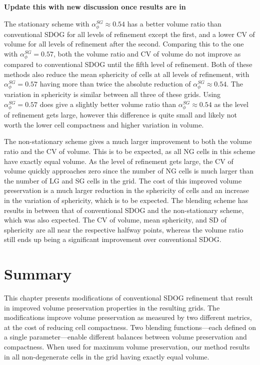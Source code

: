 \textbf{Update this with new discussion once results are in}

The stationary scheme with $\alpha_{\phi}^{SG} \approx 0.54$ has a better volume ratio than conventional SDOG for all levels of refinement except the first, and a lower CV of volume for all levels of refinement after the second.
Comparing this to the one with $\alpha_{\phi}^{SG} = 0.57$, both the volume ratio and CV of volume do not improve as compared to conventional SDOG until the fifth level of refinement.
Both of these methods also reduce the mean sphericity of cells at all levels of refinement, with $\alpha_{\phi}^{SG} = 0.57$ having more than twice the absolute reduction of $\alpha_{\phi}^{SG} \approx 0.54$.
The variation in sphericity is similar between all three of these grids.
Using $\alpha_{\phi}^{SG} = 0.57$ does give a slightly better volume ratio than $\alpha_{\phi}^{SG} \approx 0.54$ as the level of refinement gets large, however this difference is quite small and likely not worth the lower cell compactness and higher variation in volume.


The non-stationary scheme gives a much larger improvement to both the volume ratio and the CV of volume.
This is to be expected, as all NG cells in this scheme have exactly equal volume.
As the level of refinement gets large, the CV of volume quickly approaches zero since the number of NG cells is much larger than the number of LG and SG cells in the grid.
The cost of this improved volume preservation is a much larger reduction in the sphericity of cells and an increase in the variation of sphericity, which is to be expected.
The blending scheme has results in between that of conventional SDOG and the non-stationary scheme, which was also expected.
The CV of volume, mean sphericity, and SD of sphericity are all near the respective halfway points, whereas the volume ratio still ends up being a significant improvement over conventional SDOG.

\section{Summary}
This chapter presents modifications of conventional SDOG refinement that result in improved volume preservation properties in the resulting grids.
The modifications improve volume preservation as measured by two different metrics, at the cost of reducing cell compactness.
Two blending functions---each defined on a single parameter---enable different balances between volume preservation and compactness.
When used for maximum volume preservation, our method results in all non-degenerate cells in the grid having exactly equal volume.
